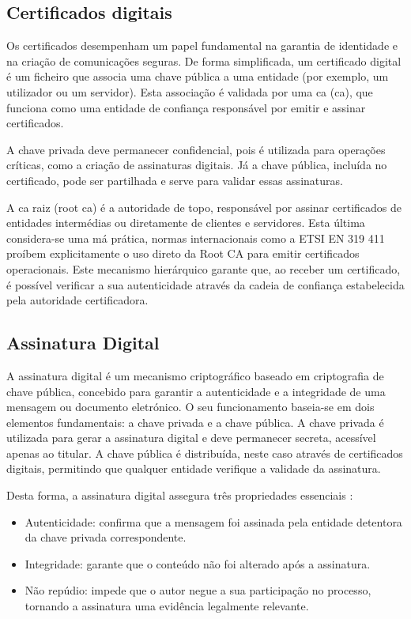 \subsection{Certificados digitais}

Os certificados desempenham um papel fundamental na garantia de identidade e na criação de comunicações seguras. De forma simplificada, um certificado digital é um ficheiro que associa uma chave pública a uma entidade (por exemplo, um utilizador ou um servidor). Esta associação é validada por uma \acrlong{ca} (\acrshort{ca}), que funciona como uma entidade de confiança responsável por emitir e assinar certificados.

A chave privada deve permanecer confidencial, pois é utilizada para operações críticas, como a criação de assinaturas digitais. Já a chave pública, incluída no certificado, pode ser partilhada e serve para validar essas assinaturas.

A \acrshort{ca} raiz (root \acrshort{ca}) é a autoridade de topo, responsável por assinar certificados de entidades intermédias ou diretamente de clientes e servidores. Esta última considera-se uma má prática, normas internacionais como a ETSI EN 319 411 \citep{ETSI_EN_319_411_1} proíbem explicitamente o uso direto da Root CA para emitir certificados operacionais. Este mecanismo hierárquico garante que, ao receber um certificado, é possível verificar a sua autenticidade através da cadeia de confiança estabelecida pela autoridade certificadora.

\subsection{Assinatura Digital}

A assinatura digital é um mecanismo criptográfico baseado em criptografia de chave pública, concebido para garantir a autenticidade e a integridade de uma mensagem ou documento eletrónico. O seu funcionamento baseia-se em dois elementos fundamentais: a chave privada e a chave pública. A chave privada é utilizada para gerar a assinatura digital e deve permanecer secreta, acessível apenas ao titular. A chave pública é distribuída, neste caso através de certificados digitais, permitindo que qualquer entidade verifique a validade da assinatura.

Desta forma, a assinatura digital assegura três propriedades essenciais \citep{digitalsignatures}:
\begin{itemize}
    \item Autenticidade: confirma que a mensagem foi assinada pela entidade detentora da chave privada correspondente.
    \item Integridade: garante que o conteúdo não foi alterado após a assinatura.
    \item Não repúdio: impede que o autor negue a sua participação no processo, tornando a assinatura uma evidência legalmente relevante.
\end{itemize}

